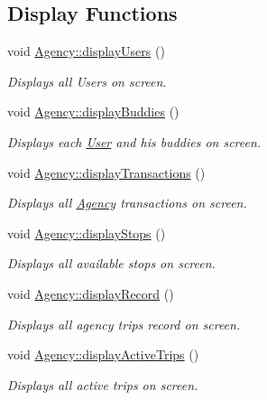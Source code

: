 \subsection*{Display Functions}
\begin{DoxyCompactItemize}
\item 
void \hyperlink{group___agency_ga485882deafb4fc8d075c9cb096ebd35c}{Agency\+::display\+Users} ()
\begin{DoxyCompactList}\small\item\em Displays all Users on screen. \end{DoxyCompactList}\item 
\mbox{\label{group___agency_ga319cf67aaea58bc778455283a18fd2c0}} 
void \hyperlink{group___agency_ga319cf67aaea58bc778455283a18fd2c0}{Agency\+::display\+Buddies} ()
\begin{DoxyCompactList}\small\item\em Displays each \hyperlink{class_user}{User} and his buddies on screen. \end{DoxyCompactList}\item 
\mbox{\label{group___agency_gad3c880c51f35459cf189ffc4a43203ba}} 
void \hyperlink{group___agency_gad3c880c51f35459cf189ffc4a43203ba}{Agency\+::display\+Transactions} ()
\begin{DoxyCompactList}\small\item\em Displays all \hyperlink{class_agency}{Agency} transactions on screen. \end{DoxyCompactList}\item 
\mbox{\label{group___agency_gaae86bb356ef4c2f1232d33408e5a3a22}} 
void \hyperlink{group___agency_gaae86bb356ef4c2f1232d33408e5a3a22}{Agency\+::display\+Stops} ()
\begin{DoxyCompactList}\small\item\em Displays all available stops on screen. \end{DoxyCompactList}\item 
\mbox{\label{group___agency_gabae4f41bfdd7c7965701afe34ad5aec4}} 
void \hyperlink{group___agency_gabae4f41bfdd7c7965701afe34ad5aec4}{Agency\+::display\+Record} ()
\begin{DoxyCompactList}\small\item\em Displays all agency trips record on screen. \end{DoxyCompactList}\item 
\mbox{\label{group___agency_ga3ce9f0643c267083baa3145ddbfd72a4}} 
void \hyperlink{group___agency_ga3ce9f0643c267083baa3145ddbfd72a4}{Agency\+::display\+Active\+Trips} ()
\begin{DoxyCompactList}\small\item\em Displays all active trips on screen. \end{DoxyCompactList}\end{DoxyCompactItemize}
